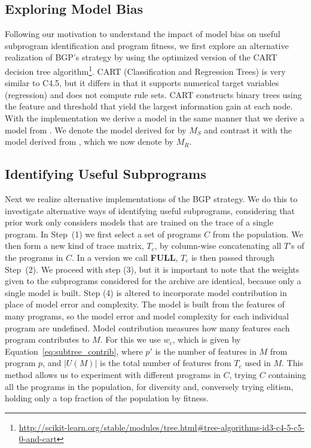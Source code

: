 \subsection{Exploring Model Bias}
Following our motivation to understand the impact of model bias on useful subprogram identification and program fitness, we first explore an alternative realization of BGP's strategy by using the \SCIKIT optimized version of the CART decision tree algorithm\footnote{\url{http://scikit-learn.org/stable/modules/tree.html\#tree-algorithms-id3-c4-5-c5-0-and-cart}}.  CART (Classification and Regression Trees) is very similar to C4.5, but it differs in that it supports numerical target variables (regression) and does not compute rule sets. CART constructs binary trees using the feature and threshold that yield the largest information gain at each node.  With the \SCIKIT implementation we derive a model in the same manner that we derive a model from \REPTREE.  We denote the model derived for \SCIKIT by $M_S$ and contrast it with the model derived from \REPTREE, which we now denote by $M_R$.

\subsection{Identifying Useful Subprograms}
\newcommand{\FULL}{\textbf{FULL}\xspace}
\newcommand{\DRAW}{\textbf{DRAW}\xspace}
Next we realize alternative implementations of the BGP strategy. We do this to investigate alternative ways of identifying useful subprograms, considering that prior work only considers models that are trained on the trace of a single program. In Step~(1) we first select a set of programs  $C$ from the population. We then form a new kind of trace matrix, $T_c$, by column-wise concatenating all $T${'s} of the programs in $C$. In a version we call \FULL,  $T_c$ is then passed through Step~(2). We proceed with step (3), but it is important to note that the weights given to the subprograms considered for the archive are identical, because only a single model is built. Step (4) is altered to incorporate model contribution in place of model error and complexity. The model is built from the features of many programs, so the model error and model complexity for each individual program are undefined. Model contribution measures how many features each program contributes to $M$.  For this we use $w_{c}$, which is given by Equation~\ref{eq:subtree_contrib}, where $p'$ is the number of features in $M$ from program $p$, and $|U(M)|$ is the total number of features from $T_{c}$ used in $M$. This method allows us to experiment with different programs in $C$, trying $C$ containing all the programs in the population, for diversity and, conversely trying elitism, holding only a top fraction of the  population by fitness. 

